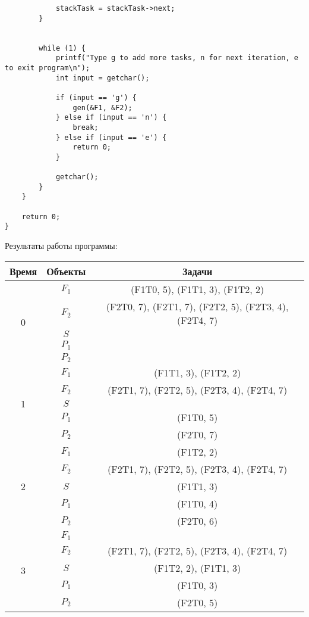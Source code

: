\documentclass[a4paper,14pt]{extarticle}
\begin{document}
\begin{enumerate}
\begin{verbatim}
            stackTask = stackTask->next;
        }
        

        while (1) {
            printf("Type g to add more tasks, n for next iteration, e to exit program\n");
            int input = getchar();

            if (input == 'g') {
                gen(&F1, &F2);
            } else if (input == 'n') {
                break;
            } else if (input == 'e') {
                return 0;
            }

            getchar();
        }
    }

    return 0;
}
\end{verbatim}
Результаты работы программы:\\
\begin{longtable}{|c|c|c|}
    \hline
    Время&Объекты&Задачи\\
    \hline
\multirow{5}{*}{0}&$F_1$&(F1T0, 5), (F1T1, 3), (F1T2, 2)\\
\cline{2-3}
&$F_2$&(F2T0, 7), (F2T1, 7), (F2T2, 5), (F2T3, 4), (F2T4, 7)\\
\cline{2-3}
& $S$ &\\
\cline{2-3}
&$P_1$&\\
\cline{2-3}
&$P_2$&\\
\hline


\multirow{5}{*}{1}&$F_1$&(F1T1, 3), (F1T2, 2)\\
\cline{2-3}
&$F_2$&(F2T1, 7), (F2T2, 5), (F2T3, 4), (F2T4, 7)\\
\cline{2-3}
& $S$ &\\
\cline{2-3}
&$P_1$&(F1T0, 5)\\
\cline{2-3}
&$P_2$&(F2T0, 7)\\
\hline


\multirow{5}{*}{2}&$F_1$&(F1T2, 2)\\
\cline{2-3}
&$F_2$&(F2T1, 7), (F2T2, 5), (F2T3, 4), (F2T4, 7)\\
\cline{2-3}
& $S$ &(F1T1, 3)\\
\cline{2-3}
&$P_1$&(F1T0, 4)\\
\cline{2-3}
&$P_2$&(F2T0, 6)\\
\hline


\multirow{5}{*}{3}&$F_1$&\\
\cline{2-3}
&$F_2$&(F2T1, 7), (F2T2, 5), (F2T3, 4), (F2T4, 7)\\
\cline{2-3}
& $S$ &(F1T2, 2), (F1T1, 3)\\
\cline{2-3}
&$P_1$&(F1T0, 3)\\
\cline{2-3}
&$P_2$&(F2T0, 5)\\
\hline



\end{longtable}
\end{enumerate}
\end{document}
